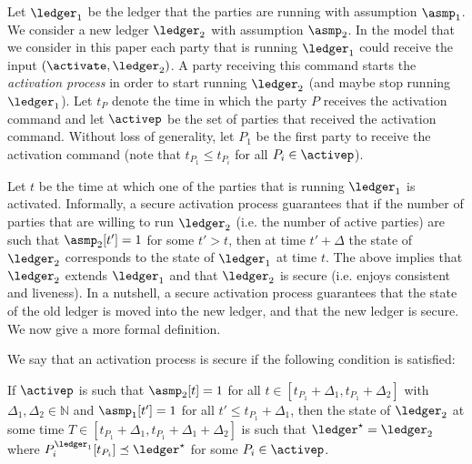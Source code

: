 Let $\ledger_1$ be the ledger that the parties are running with assumption $\asmp_1$. We consider a new ledger $\ledger_2$ with assumption $\asmp_2$.
In the model that we consider in this paper each party that is running $\ledger_1$ could receive the input $(\activate, \ledger_2)$. A party receiving this command starts the \emph{activation process}
in order to start running $\ledger_2$ (and maybe stop running $\ledger_1$). Let $t_P$ denote the time in which 
the party $P$ receives the activation command and let $\activep$ be the set of parties that received the activation command. Without loss of generality, let $P_1$ be the first party to receive the activation command (note that $t_{P_1}\leq t_{P_i}$ for all $P_i\in\activep$).

Let $t$ be the time at which one of the parties that is running $\ledger_1$ is activated. Informally, a secure activation process guarantees that if the number of parties that are willing to run $\ledger_2$ (i.e. the number of active parties)  
are such that $\asmp_2[t']=1$ for some $t'>t$, then at time $t'+\Delta$ the state of $\ledger_2$ corresponds to the state of $\ledger_1$ at time $t$. 
The above implies that $\ledger_2$ extends $\ledger_1$ and that $\ledger_2$ is secure (i.e. enjoys consistent and liveness).
In a nutshell, a secure activation process guarantees that the state of the old ledger is moved into the new ledger, and that the new ledger is secure.
We now give a more formal definition.

\begin{definition}
 We say that an activation process is secure if the following condition is satisfied:

If $\activep$ is such that $\asmp_2[t]=1$ for all $t\in [t_{P_1}+\Delta_1, t_{P_1}+\Delta_2]$ with $\Delta_1,\Delta_2\in\mathbb{N}$
	and $\asmp_1[t']=1$ for all $t' \leq t_{P_1}+\Delta_1$, then the state of $\ledger_2$ at some time $T\in [t_{P_1}+\Delta_1, t_{P_1}+\Delta_1+\Delta_2]$ is such that $\ledger^\star=\ledger_2$
	where $  P_i^{\ledger_1}[t_{P_i}] \preceq \ledger^\star$ for some $P_i\in\activep$.  
\end{definition}





